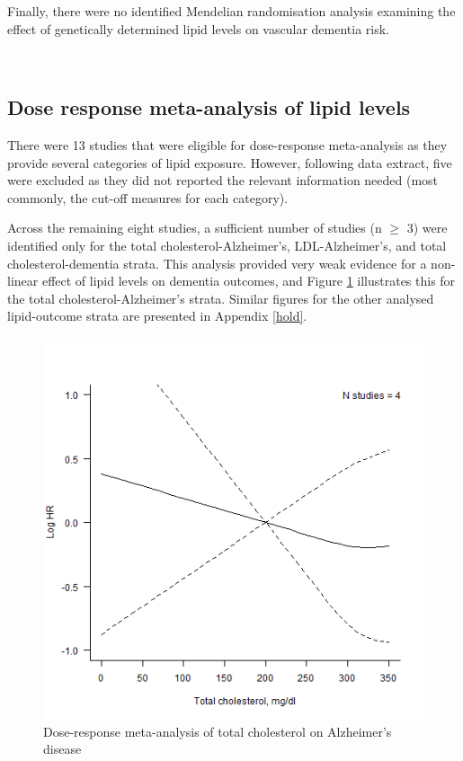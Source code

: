 \documentclass[a4paper, twoside]{templates/ociamthesis}
\begin{document}
Finally, there were no identified Mendelian randomisation analysis examining the effect of genetically determined lipid levels on vascular dementia risk.

~

\hypertarget{dose-response-results}{%
\subsection{Dose response meta-analysis of lipid levels}\label{dose-response-results}}

There were 13 studies that were eligible for dose-response meta-analysis as they provide several categories of lipid exposure. However, following data extract, five were excluded as they did not reported the relevant information needed (most commonly, the cut-off measures for each category).

Across the remaining eight studies, a sufficient number of studies (n \(\geqslant\) 3) were identified only for the total cholesterol-Alzheimer's, LDL-Alzheimer's, and total cholesterol-dementia strata. This analysis provided very weak evidence for a non-linear effect of lipid levels on dementia outcomes, and Figure \ref{fig:lipidsDoseResponse} illustrates this for the total cholesterol-Alzheimer's strata. Similar figures for the other analysed lipid-outcome strata are presented in Appendix \ref{hold}.





\begin{figure}[H]

{\centering \includegraphics[width=0.7\linewidth]{figures/sys-rev/dr_AD_TC} 

}

\caption[Dose-response meta-analysis of total cholesterol]{Dose-response meta-analysis of total cholesterol on Alzheimer's disease}\label{fig:lipidsDoseResponse}
\end{figure}
\end{document}
